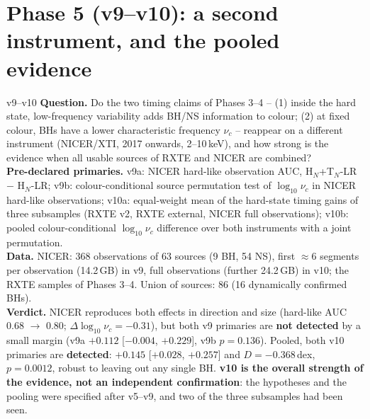 \chapter{Phase 5 (v9--v10): a second instrument, and the pooled evidence}\label{ch:phase5}

\begin{glance}{v9--v10}
\textbf{Question.} Do the two timing claims of Phases 3--4 -- (1) inside the hard state, low-frequency variability adds
BH/NS information to colour; (2) at fixed colour, BHs have a lower characteristic frequency $\nu_c$ -- reappear on a
different instrument (NICER/XTI, 2017 onwards, 2--10\,keV), and how strong is the evidence when all usable sources of RXTE
and NICER are combined? \\
\textbf{Pre-declared primaries.} v9a: NICER hard-like observation AUC, H$_N$+T$_N$-LR $-$ H$_N$-LR; v9b: colour-conditional
source permutation test of $\log_{10}\nu_c$ in NICER hard-like observations; v10a: equal-weight mean of the hard-state
timing gains of three subsamples (RXTE v2, RXTE external, NICER full observations); v10b: pooled colour-conditional
$\log_{10}\nu_c$ difference over both instruments with a joint permutation. \\
\textbf{Data.} NICER: 368 observations of 63 sources (9 BH, 54 NS), first $\approx6$ segments per observation (14.2\,GB) in v9,
full observations (further 24.2\,GB) in v10; the RXTE samples of Phases 3--4. Union of sources: 86 (16 dynamically
confirmed BHs). \\
\textbf{Verdict.} NICER reproduces both effects in direction and size (hard-like AUC 0.68 $\to$ 0.80; $\Delta\log_{10}\nu_c=-0.31$),
but both v9 primaries are \textbf{not detected} by a small margin (v9a $+0.112$ [$-0.004$, $+0.229$], v9b $p=0.136$). Pooled,
both v10 primaries are \textbf{detected}: $+0.145$ [$+0.028$, $+0.257$] and $D=-0.368$\,dex, $p=0.0012$, robust to leaving out
any single BH. \textbf{v10 is the overall strength of the evidence, not an independent confirmation}: the hypotheses and the
pooling were specified after v5--v9, and two of the three subsamples had been seen.
\end{glance}

